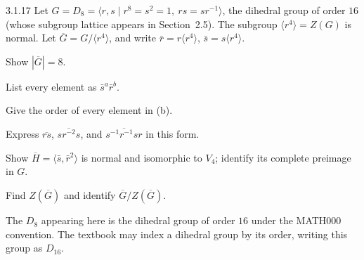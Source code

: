 \documentclass[11pt,oneside]{article}
\begin{document}
\begin{exercise}{3.1.17}
Let $G=D_8=\langle r,s\mid r^8=s^2=1,\ rs=sr^{-1}\rangle$, the dihedral group of order $16$ (whose subgroup lattice appears in Section~2.5). The subgroup $\langle r^4\rangle=Z(G)$ is normal. Let $\overline G=G/\langle r^4\rangle$, and write $\bar r=r\langle r^4\rangle$, $\bar s=s\langle r^4\rangle$.
\begin{exercisesubparts}
\item Show $|\overline G|=8$.
\item List every element as $\bar s^a\bar r^b$.
\item Give the order of every element in (b).
\item Express $\overline{rs}$, $\overline{sr^{-2}s}$, and $\overline{s^{-1}r^{-1}sr}$ in this form.
\item Show $\overline H=\langle\bar s,\bar r^2\rangle$ is normal and isomorphic to $V_4$; identify its complete preimage in $G$.
\item Find $Z(\overline G)$ and identify $\overline G/Z(\overline G)$.
\end{exercisesubparts}
\end{exercise}

\begin{notation}
The $D_8$ appearing here is the dihedral group of order $16$ under the MATH000 convention. The textbook may index a dihedral group by its order, writing this group as $D_{16}$.
\end{notation}
\end{document}
